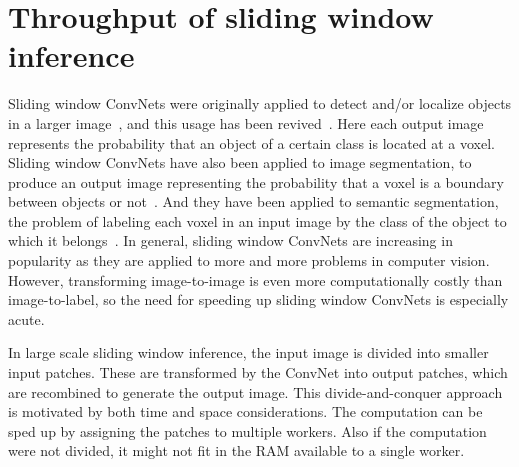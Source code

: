 \documentclass[conference]{./IEEEtran/IEEEtran}
\begin{document}


\section{Throughput of sliding window inference}
  Sliding window ConvNets were originally applied to detect and/or
  localize objects in a larger image~\cite{matan1991multi}, and this
  usage has been revived~\cite{sermanet2013overfeat}. Here each output
  image represents the probability that an object of a certain class
  is located at a voxel.  Sliding window ConvNets have also been
  applied to image segmentation, to produce an output image
  representing the probability that a voxel is a boundary between
  objects or not~\cite{jain2007supervised}.  And they have been
  applied to semantic segmentation, the problem of labeling each voxel
  in an input image by the class of the object to which it
  belongs~\cite{ning2005toward}.  In general, sliding window ConvNets
  are increasing in popularity as they are applied to more and more
  problems in computer vision.  However, transforming image-to-image
  is even more computationally costly than image-to-label, so the need
  for speeding up sliding window ConvNets is especially acute.

  In large scale sliding window inference, the input image is divided
  into smaller input patches. These are transformed by the ConvNet
  into output patches, which are recombined to generate the output
  image.  This divide-and-conquer approach is motivated by both time
  and space considerations.  The computation can be sped up by
  assigning the patches to multiple workers.  Also if the computation
  were not divided, it might not fit in the RAM available to a single
  worker.
\end{document}
